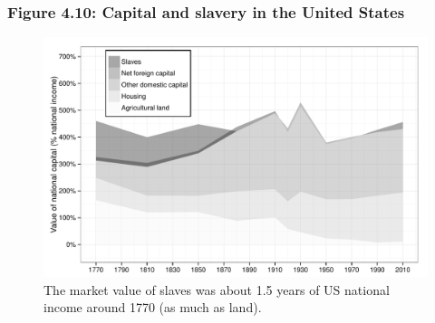 \documentclass[t]{beamer}\usepackage[]{graphicx}\usepackage[]{color}
\newenvironment{knitrout}{}{} %
\begin{document}
\begin{frame}[label=Figure_4_10]
\frametitle{Figure 4.10: Capital and slavery in the United States}
\begin{figure}[t]
\begin{minipage}[b]{\textwidth}
\centering
\begin{knitrout}\footnotesize
{}\color{fgcolor}

{\centering \includegraphics[width=1\linewidth]{figures/bw/Figure_4_10} 

}



\end{knitrout}
\caption{The market value of slaves was about 1.5 years of US national income around 1770 (as much as land).}
\end{minipage}
\end{figure}
\end{frame}
\end{document}
